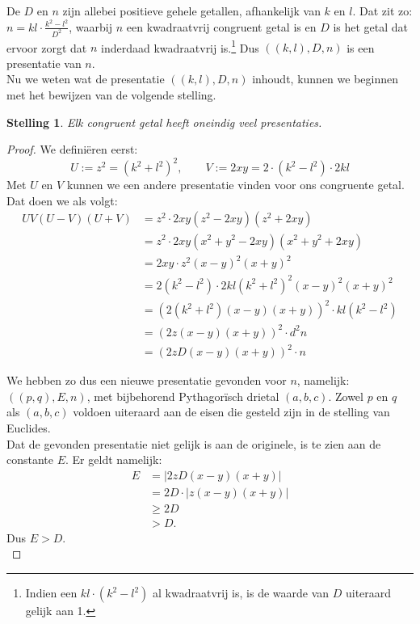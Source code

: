 \documentclass[12pt,reqno]{article}
\theoremstyle{theorem}
\newtheorem{theorem}{Stelling}
\theoremstyle{definition}
\begin{document}
	De $D$ en $n$ zijn allebei positieve gehele getallen, afhankelijk van $k$ en $l$. Dat zit zo: $n=kl\cdot \frac{k^2-l^2}{D^2}$, waarbij $n$ een kwadraatvrij congruent getal is en $D$ is het getal dat ervoor zorgt dat $n$ inderdaad kwadraatvrij is.\footnote{Indien een $kl\cdot(k^2-l^2)$ al kwadraatvrij is, is de waarde van $D$ uiteraard gelijk aan 1.} Dus $((k,l),D,n)$ is een presentatie van $n$.\\
	
	Nu we weten wat de presentatie $((k,l),D,n)$ inhoudt, kunnen we beginnen met het bewijzen van de volgende stelling.	
	\begin{theorem}
		Elk congruent getal heeft oneindig veel presentaties.
	\end{theorem}
	
	\begin{proof}
		We defini\"eren eerst:
		\begin{equation*}
			U:=z^2=(k^2+l^2)^2, \qquad V:=2xy=2\cdot(k^2-l^2)\cdot 2kl
		\end{equation*}
		Met $U$ en $V$ kunnen we een andere presentatie vinden voor ons congruente getal. Dat doen we als volgt:
		\begin{align*}
			UV (U - V) (U + V) &= z^2 \cdot 2xy (z^2 - 2xy) (z^2 + 2xy)\\
			&= z^2 \cdot 2xy (x^2 + y^2 - 2xy) (x^2 + y^2 + 2xy)\\
			&= 2xy \cdot z^2 (x - y)^2 (x + y)^2\\
			&= 2 (k^2-l^2) \cdot 2kl (k^2+l^2)^2 (x - y)^2 (x + y)^2\\
			&= (2 (k^2+l^2) (x-y) (x+y))^2 \cdot kl (k^2-l^2)\\
			&= (2 z (x - y) (x + y))^2 \cdot d^2n\\
			&= (2 z D (x - y) (x + y))^2 \cdot n
		\end{align*}
		
		We hebben zo dus een nieuwe presentatie gevonden voor $n$, namelijk: $((p,q),E,n)$, met bijbehorend Pythagor\"isch drietal $(a,b,c)$. Zowel $p$ en $q$ als $(a,b,c)$ voldoen uiteraard aan de eisen die gesteld zijn in de stelling van Euclides.\\
		
		Dat de gevonden presentatie niet gelijk is aan de originele, is te zien aan de constante $E$. Er geldt namelijk:
		\begin{align*}
			E &= | 2 z D (x-y) (x+y) | \\
			&= 2 D \cdot | z (x-y) (x+y) | \\
			&\geq 2 D \\
			&> D.
		\end{align*}
		Dus $E > D$.\\
		

\end{proof}
\end{document}
